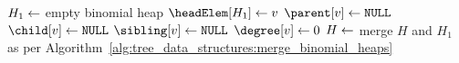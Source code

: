 
\DontPrintSemicolon
\SetAlgoNoLine
\BlankLine
$H_1 \leftarrow$ empty binomial heap\;
$\headElem[H_1] \assign v$\;
$\parent[v] \assign \texttt{NULL}$\;
$\child[v] \assign \texttt{NULL}$\;
$\sibling[v] \assign \texttt{NULL}$\;
$\degree[v] \assign 0$\;
$H \leftarrow$ merge $H$ and $H_1$ as per Algorithm~\ref{alg:tree_data_structures:merge_binomial_heaps}\;
